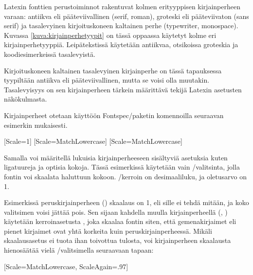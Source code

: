 Latexin fonttien perus\-toiminnot rakentuvat kolmen erityyppisen
kirjainperheen varaan: antiikva eli pääteviivallinen
(\textenglish{serif, roman}), groteski eli pääteviivaton
(\textenglish{sans serif}) ja tasalevyinen kirjoituskoneen kaltainen
perhe (\textenglish{typewriter, monospace}). Kuvassa
\ref{kuva:kirjainperhetyypit} on tässä oppaassa käytetyt kolme eri
kirjainperhetyyppiä. Leipätekstissä käytetään antiikvaa, otsikoissa
groteskia ja koodi\-esi\-mer\-keis\-sä tasalevyistä.


Kirjoituskoneen kaltainen tasalevyinen kirjainperhe on tässä tapauksessa
tyypiltään antiikva eli pääteviivallinen, mutta se voisi olla muutakin.
Tasalevyisyys on sen kirjainperheen tärkein määrittävä tekijä Latexin
asetusten näkökulmasta.

Kirjainperheet otetaan käyttöön Fontspec\-/paketin komennoilla seuraavan
esimerkin mukaisesti.

\begin{koodilohkosis}
  \usepackage{fontspec}
  \setmainfont{Linux Libertine O}[Scale=1]
  \setsansfont{Linux Biolinum O}[Scale=MatchLowercase]
  \setmonofont{Linux Libertine Mono O}[Scale=MatchLowercase]
\end{koodilohkosis}

Samalla voi määritellä lukuisia kirjainperheeseen sisältyviä asetuksia
kuten ligatuureja ja optisia kokoja. Tässä esimerkissä käytetään vain
\-/valitsinta, jolla fontin voi skaalata haluttuun kokoon.
\-/kerroin on desimaaliluku, ja oletus\-arvo on 1.

Esimerkissä peruskirjainperheen () skaalaus on
1, eli sille ei tehdä mitään, ja koko valitsimen voisi jättää pois. Sen
sijaan kahdella muulla kirjainperheellä (,
) käytetään ker\-roin\-ase\-tus\-ta
, joka skaalaa fontin siten, että gemenakirjaimet
eli pienet kirjaimet ovat yhtä korkeita kuin peruskirjainperheessä.
Mikäli skaa\-laus\-ase\-tus  ei tuota ihan
toivottua tulosta, voi kirjainperheen skaalausta hienosäätää vielä
\-/valitsimella seuraavaan tapaan:

\begin{koodilohkosis}
  \setmonofont{Linux Libertine Mono O}
  [Scale=MatchLowercase, ScaleAgain=.97]
\end{koodilohkosis}

